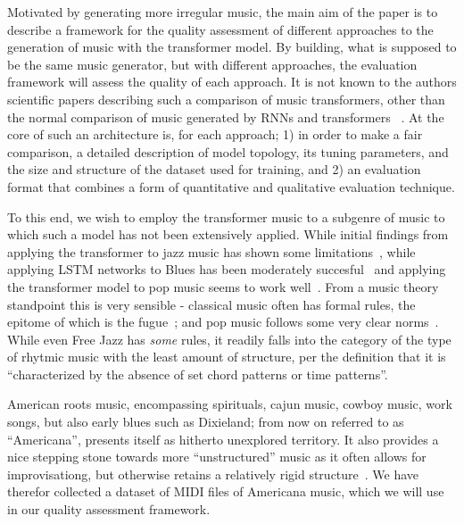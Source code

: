 \documentclass{IEEEtran}
\begin{document}
        Motivated by generating more irregular music, the main aim of the paper is
        to describe a framework for the quality assessment of different approaches to the generation 
        of music with the transformer model. By building, what is supposed to be the same 
        music generator, but with different approaches, the evaluation framework will assess 
        the quality of each approach. It is not known to the authors scientific papers
        describing such a comparison of music transformers, other than the normal
        comparison of music generated by RNNs and transformers ~\cite{huang2018music}.
        At the core of such an architecture is, for each approach; 1) in order to make a fair comparison,
        a detailed description of model topology, its tuning parameters, and the size
        and structure of the dataset used for training, and 2) an evaluation format
        that combines a form of quantitative and qualitative evaluation technique.
       
        To this end, we wish to employ the transformer music to a subgenre of music   
        to which such a model has not been extensively applied.
        While initial findings from applying the transformer to jazz music has shown 
        some limitations~\cite{wu2020jazz}, while applying LSTM networks to Blues has 
        been moderately succesful~\cite{eck2002bluesLSTM} and applying the transformer 
        model to pop music seems to work well~\cite{huang2020pop}.
        From a music theory standpoint this is very sensible - classical music often has 
        formal rules, the epitome of which is the fugue~\cite{giraud2015computational};
        and pop music follows some very clear norms~\cite{hennion1983production}. While 
        even Free Jazz has \emph{some} rules, it readily falls into the category of the 
        type of rhytmic music with the least amount of structure, per the definition
        that it is ``characterized by the absence of set chord patterns or
        time patterns''\cite{FreeJazz}.

        American roots music, encompassing spirituals, cajun music, cowboy music, work songs,
        but also early blues such as Dixieland; from now on referred to as ``Americana'', presents 
        itself as hitherto unexplored territory. It also provides a nice stepping stone
        towards more ``unstructured'' music as it often allows for improvisationg, but 
        otherwise retains a relatively rigid structure~\cite{libcong}.
        We have therefor collected a dataset of MIDI files of Americana music, which we
        will use in our quality assessment framework.
\end{document}
